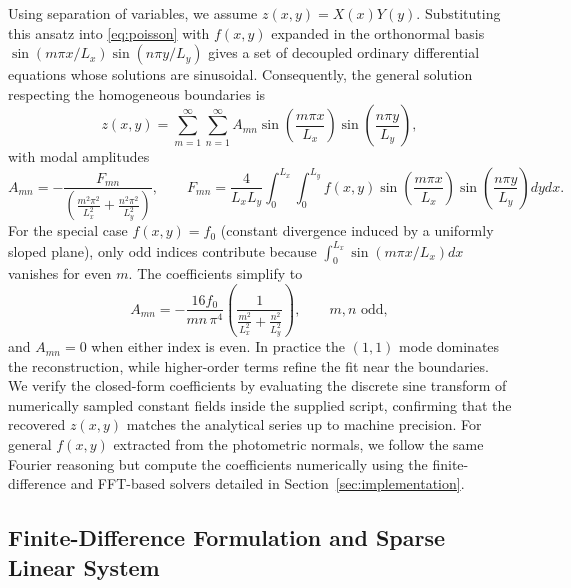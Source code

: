 \documentclass[11pt]{article}
\begin{document}
Using separation of variables, we assume $z(x,y) = X(x)Y(y)$. Substituting this ansatz into \eqref{eq:poisson} with $f(x,y)$ expanded in the orthonormal basis $\sin(m\pi x/L_x)\sin(n\pi y/L_y)$ gives a set of decoupled ordinary differential equations whose solutions are sinusoidal. Consequently, the general solution respecting the homogeneous boundaries is
\begin{equation}
z(x,y) = \sum_{m=1}^{\infty}\sum_{n=1}^{\infty} A_{mn} \sin\left(\frac{m\pi x}{L_x}\right) \sin\left(\frac{n\pi y}{L_y}\right),
\end{equation}
with modal amplitudes
\begin{equation}
A_{mn} = -\frac{F_{mn}}{\left(\frac{m^2\pi^2}{L_x^2}+\frac{n^2\pi^2}{L_y^2}\right)}, \qquad F_{mn} = \frac{4}{L_x L_y} \int_0^{L_x}\!\int_0^{L_y} f(x,y) \sin\left(\frac{m\pi x}{L_x}\right) \sin\left(\frac{n\pi y}{L_y}\right) dy dx.
\end{equation}
For the special case $f(x,y)=f_0$ (constant divergence induced by a uniformly sloped plane), only odd indices contribute because $\int_0^{L_x} \sin(m\pi x/L_x) dx$ vanishes for even $m$. The coefficients simplify to
\begin{equation}
A_{mn} = -\frac{16 f_0}{mn\,\pi^4} \left(\frac{1}{\frac{m^2}{L_x^2}+\frac{n^2}{L_y^2}}\right), \qquad m,n \text{ odd},
\end{equation}
and $A_{mn}=0$ when either index is even. In practice the $(1,1)$ mode dominates the reconstruction, while higher-order terms refine the fit near the boundaries. We verify the closed-form coefficients by evaluating the discrete sine transform of numerically sampled constant fields inside the supplied script, confirming that the recovered $z(x,y)$ matches the analytical series up to machine precision. For general $f(x,y)$ extracted from the photometric normals, we follow the same Fourier reasoning but compute the coefficients numerically using the finite-difference and FFT-based solvers detailed in Section~\ref{sec:implementation}.

\subsection{Finite-Difference Formulation and Sparse Linear System}
\end{document}
